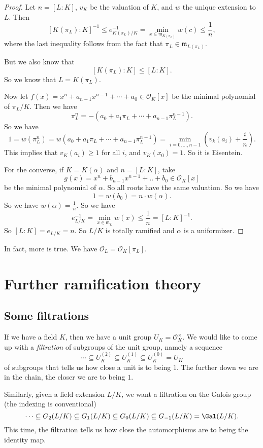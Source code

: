 \documentclass[a4paper]{article}
\begin{document}
\begin{proof}
  Let $n = [L:K]$, $v_K$ be the valuation of $K$, and $w$ the unique extension to $L$. Then
  \[
    [K(\pi_L): K]^{-1} \leq e_{K(\pi_L)/K}^{-1} = \min_{x \in \mathfrak{m}_{K(\pi_L)}} w(c) \leq \frac{1}{n},
  \]
  where the last inequality follows from the fact that $\pi_L \in \mathfrak{m}_{L(\pi_L)}$.

  But we also know that
  \[
    [K(\pi_L):K] \leq [L:K].
  \]
  So we know that $L = K(\pi_L)$.

  Now let $f(x) = x^n + a_{n - 1} x^{n - 1} + \cdots + a_0 \in \mathcal{O}_K[x]$ be the minimal polynomial of $\pi_L/K$. Then we have
  \[
    \pi_L^n = -(a_0 + a_1 \pi_L + \cdots + a_{n - 1}\pi_L^{n - 1}).
  \]
  So we have
  \[
    1 = w(\pi_L^n) = w(a_0 + a_1 \pi_L + \cdots + a_{n - 1}\pi_L^{n - 1}) = \min_{i = 0, \ldots, n - 1} \left(v_k(a_i) + \frac{i}{n}\right).
  \]
  This implies that $v_K(a_i) \geq 1$ for all $i$, and $v_K(x_0) = 1$. So it is Eisentein.

  For the converse, if $K = K(\alpha)$ and $n = [L:K]$, take
  \[
    g(x) = x^n + b_{n - 1} x^{n - 1} + .. + b_0 \in \mathcal{O}_K[x]
  \]
  be the minimal polynomial of $\alpha$. So all roots have the same valuation. So we have
  \[
    1 = w(b_0) = n \cdot w(\alpha).
  \]
  So we have $w(\alpha) = \frac{1}{n}$. So we have
  \[
    e_{L/K}^{-1} = \min_{x \in \mathfrak{m}_L} w(x) \leq \frac{1}{n} = [L:K]^{-1}.
  \]
  So $[L:K] = e_{L/K} = n$. So $L/K$ is totally ramified and $\alpha$ is a uniformizer.
\end{proof}
In fact, more is true. We have $\mathcal{O}_L = \mathcal{O}_K[\pi_L]$.

\section{Further ramification theory}
\subsection{Some filtrations}
If we have a field $K$, then we have a unit group $U_K = \mathcal{O}_K^\times$. We would like to come up with a \emph{filtration} of subgroups of the unit group, namely a sequence
\[
  \cdots \subseteq U_K^{(2)} \subseteq U_K^{(1)} \subseteq U_K^{(0)} = U_K
\]
of subgroups that tells us how close a unit is to being $1$. The further down we are in the chain, the closer we are to being $1$.

Similarly, given a field extension $L/K$, we want a filtration on the Galois group (the indexing is conventional)
\[
  \cdots\subseteq G_2(L/K) \subseteq G_1(L/K) \subseteq G_0(L/K) \subseteq G_{-1}(L/K) = \Gal(L/K).
\]
This time, the filtration tells us how close the automorphisms are to being the identity map.
\end{document}
